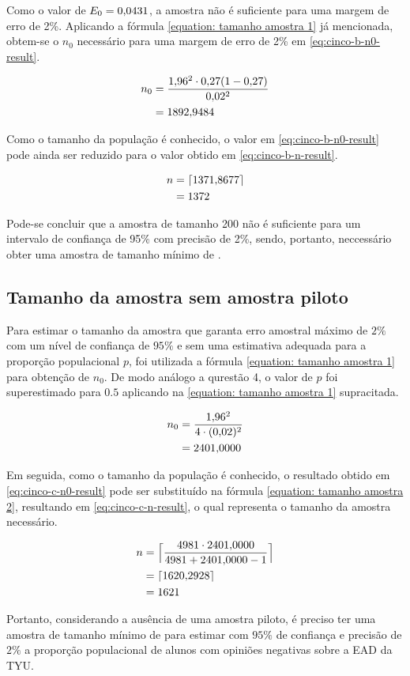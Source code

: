 	Como o valor de $E_0 = \num{0.0431}$, a amostra não é suficiente para uma
	margem de erro de 2\%. Aplicando a fórmula \autoref{equation: tamanho amostra 1} já
	mencionada, obtem-se o $n_0$ necessário para uma margem de erro de 2\%
	em \eqref{eq:cinco-b-n0-result}.

	\begin{align}
		n_0 &= \frac{\num{1.96}^2 \cdot \num{0.27}(1-\num{0.27})}{\num{0.02}^2} \nonumber \\
			&= \label{eq:cinco-b-n0-result}
			   \num{1892.9484}	
	\end{align}

	Como o tamanho da população é conhecido, o valor em
	\eqref{eq:cinco-b-n0-result} pode ainda ser reduzido para o valor obtido
	em \eqref{eq:cinco-b-n-result}.

	\begin{align}
		n &= \lceil \num{1371.8677} \nonumber \rceil \\
		  &= \label{eq:cinco-b-n-result} 
			 1372
	\end{align}

	Pode-se concluir que a amostra de tamanho 200 não é suficiente para um
	intervalo de confiança de 95\% com precisão de 2\%, sendo, portanto,
	neccessário obter uma amostra de tamanho mínimo de \CINCOBnceil.

\subsection{Tamanho da amostra sem amostra piloto}

	Para estimar o tamanho da amostra que garanta erro amostral máximo de
	$2\%$ com um nível de confiança de $95\%$ e sem uma estimativa adequada
	para a proporção populacional $p$, foi utilizada a fórmula
	\autoref{equation: tamanho amostra 1} para obtenção de $n_0$.  
	De modo análogo a qurestão 4, o valor de $p$ foi superestimado para $\num{0.5}$ 
	aplicando na \autoref{equation: tamanho amostra 1} supracitada.

	\begin{align}
		n_0 &= \frac{\num{1.96}^2}{4 \cdot (\num{0.02})^2} \nonumber \\
			&= \label{eq:cinco-c-n0-result}
			   \num{2401.0000}
	\end{align}

	Em seguida, como o tamanho da população é conhecido, o resultado obtido
	em \eqref{eq:cinco-c-n0-result} pode ser substituído na fórmula
	\autoref{equation: tamanho amostra 2}, resultando em \eqref{eq:cinco-c-n-result}, o qual
	representa o tamanho da amostra necessário.

	\begin{align}
		n &= \Big\lceil \frac{4981 \cdot \num{2401.0000}}{4981 + \num{2401.0000} - 1}
		  \nonumber \Big\rceil \\
		  &= \lceil \num{1620.2928} \nonumber \rceil\\
		  &= \label{eq:cinco-c-n-result} 
			 1621
	\end{align}

	Portanto, considerando a ausência de uma amostra piloto, é preciso ter
	uma amostra de tamanho mínimo de \CINCOCnceil para estimar com $95\%$ de
	confiança e precisão de $2\%$ a proporção populacional de alunos com
	opiniões negativas sobre a EAD da TYU.
